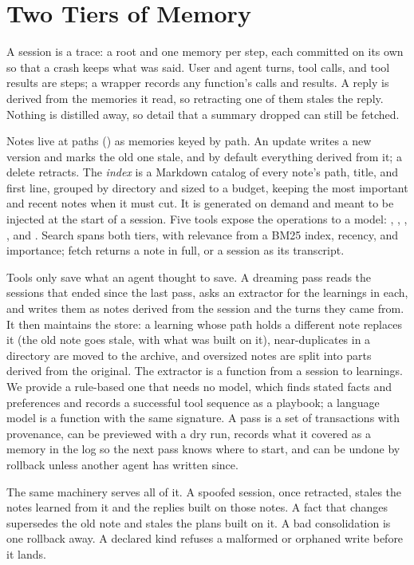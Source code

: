 \section{Two Tiers of Memory}
\label{sec:tiers}

A session is a trace: a root and one memory per step, each committed on its own
so that a crash keeps what was said. User and agent turns, tool calls, and tool
results are steps; a wrapper records any function's calls and results. A reply
is derived from the memories it read, so retracting one of them stales the reply.
Nothing is distilled away, so detail that a summary dropped can still be fetched.

Notes live at paths () as memories keyed by path. An update
writes a new version and marks the old one stale, and by default everything
derived from it; a delete retracts. The \emph{index} is a Markdown catalog of
every note's path, title, and first line, grouped by directory and sized to a
budget, keeping the most important and recent notes when it must cut. It is
generated on demand and meant to be injected at the start of a session. Five
tools expose the operations to a model: , ,
, , and . Search
spans both tiers, with relevance from a BM25 index, recency, and importance;
fetch returns a note in full, or a session as its transcript.

Tools only save what an agent thought to save. A dreaming pass reads the sessions
that ended since the last pass, asks an extractor for the learnings in each, and
writes them as notes derived from the session and the turns they came from. It
then maintains the store: a learning whose path holds a different note replaces
it (the old note goes stale, with what was built on it), near-duplicates in a
directory are moved to the archive, and oversized notes are split into parts
derived from the original. The extractor is a function from a session to
learnings. We provide a rule-based one that needs no model, which finds stated
facts and preferences and records a successful tool sequence as a playbook; a
language model is a function with the same signature. A pass is a set of
transactions with provenance, can be previewed with a dry run, records what it
covered as a memory in the log so the next pass knows where to start, and can be
undone by rollback unless another agent has written since.

The same machinery serves all of it. A spoofed session, once retracted, stales the
notes learned from it and the replies built on those notes. A fact that changes
supersedes the old note and stales the plans built on it. A bad consolidation is
one rollback away. A declared kind refuses a malformed or orphaned write before it
lands.
